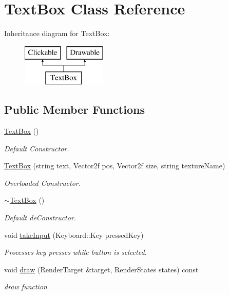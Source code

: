 \hypertarget{class_text_box}{}\section{Text\+Box Class Reference}
\label{class_text_box}
Inheritance diagram for Text\+Box\+:\begin{figure}[H]
\begin{center}
\leavevmode
\includegraphics[height=2.000000cm]{class_text_box}
\end{center}
\end{figure}
\subsection*{Public Member Functions}
\begin{DoxyCompactItemize}
\item 
\hyperlink{class_text_box_a25b67e5ff6788c60b8aef3f3540879d0}{Text\+Box} ()
\begin{DoxyCompactList}\small\item\em Default Constructor. \end{DoxyCompactList}\item 
\hyperlink{class_text_box_a9df04c5eb70d4d6b75907c56ecce6d8e}{Text\+Box} (string text, Vector2f pos, Vector2f size, string texture\+Name)
\begin{DoxyCompactList}\small\item\em Overloaded Constructor. \end{DoxyCompactList}\item 
\hyperlink{class_text_box_ac3cc88a3ac171658ebaf44b01f4adf80}{$\sim$\+Text\+Box} ()
\begin{DoxyCompactList}\small\item\em Default de\+Constructor. \end{DoxyCompactList}\item 
void \hyperlink{class_text_box_a9139c31dc807fa0c478215086f3fc7f1}{take\+Input} (Keyboard\+::\+Key pressed\+Key)
\begin{DoxyCompactList}\small\item\em Processes key presses while button is selected. \end{DoxyCompactList}\item 
void \hyperlink{class_text_box_a94f8b1fa218dabaaf892388cbf8df1fa}{draw} (Render\+Target \&target, Render\+States states) const
\begin{DoxyCompactList}\small\item\em draw function \end{DoxyCompactList}\end{DoxyCompactItemize}
